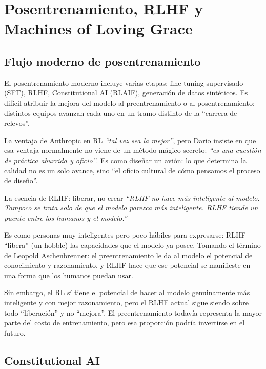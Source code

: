 \section{Posentrenamiento, RLHF y Machines of Loving Grace}

\subsection{Flujo moderno de posentrenamiento}

El posentrenamiento moderno incluye varias etapas: fine-tuning supervisado (SFT), RLHF, Constitutional AI (RLAIF), generación de datos sintéticos. Es difícil atribuir la mejora del modelo al preentrenamiento o al posentrenamiento: distintos equipos avanzan cada uno en un tramo distinto de la ``carrera de relevos''.

La ventaja de Anthropic en RL \textit{``tal vez sea la mejor''}, pero Dario insiste en que esa ventaja normalmente no viene de un método mágico secreto: \textit{``es una cuestión de práctica aburrida y oficio''}. Es como diseñar un avión: lo que determina la calidad no es un solo avance, sino ``el oficio cultural de cómo pensamos el proceso de diseño''.

\begin{importantbox}{La esencia de RLHF: liberar, no crear}
\textit{``RLHF no hace más inteligente al modelo. Tampoco se trata solo de que el modelo parezca más inteligente. RLHF tiende un puente entre los humanos y el modelo.''}

Es como personas muy inteligentes pero poco hábiles para expresarse: RLHF ``libera'' (un-hobble) las capacidades que el modelo ya posee. Tomando el término de Leopold Aschenbrenner: el preentrenamiento le da al modelo el potencial de conocimiento y razonamiento, y RLHF hace que ese potencial se manifieste en una forma que los humanos puedan usar.

Sin embargo, el RL sí tiene el potencial de hacer al modelo genuinamente más inteligente y con mejor razonamiento, pero el RLHF actual sigue siendo sobre todo ``liberación'' y no ``mejora''. El preentrenamiento todavía representa la mayor parte del costo de entrenamiento, pero esa proporción podría invertirse en el futuro.
\end{importantbox}

\subsection{Constitutional AI}

